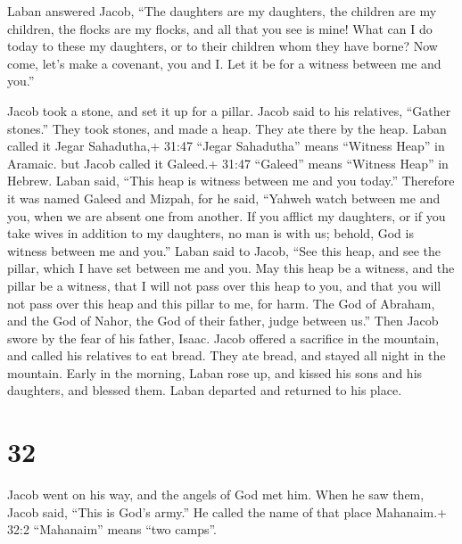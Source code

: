  Laban answered Jacob, ``The daughters are my daughters,
the children are my children, the flocks are my flocks, and all that you
see is mine! What can I do today to these my daughters, or to their
children whom they have borne?  Now come, let's make a
covenant, you and I. Let it be for a witness between me and you.''

 Jacob took a stone, and set it up for a pillar.
 Jacob said to his relatives, ``Gather stones.'' They took
stones, and made a heap. They ate there by the heap.  Laban
called it Jegar Sahadutha,+ 31:47 ``Jegar Sahadutha'' means ``Witness
Heap'' in Aramaic. but Jacob called it Galeed.+ 31:47 ``Galeed'' means
``Witness Heap'' in Hebrew.  Laban said, ``This heap is
witness between me and you today.'' Therefore it was named Galeed
 and Mizpah, for he said, ``Yahweh watch between me and
you, when we are absent one from another.  If you afflict
my daughters, or if you take wives in addition to my daughters, no man
is with us; behold, God is witness between me and you.'' 
Laban said to Jacob, ``See this heap, and see the pillar, which I have
set between me and you.  May this heap be a witness, and
the pillar be a witness, that I will not pass over this heap to you, and
that you will not pass over this heap and this pillar to me, for harm.
 The God of Abraham, and the God of Nahor, the God of their
father, judge between us.'' Then Jacob swore by the fear of his father,
Isaac.  Jacob offered a sacrifice in the mountain, and
called his relatives to eat bread. They ate bread, and stayed all night
in the mountain.  Early in the morning, Laban rose up, and
kissed his sons and his daughters, and blessed them. Laban departed and
returned to his place.

\hypertarget{section-31}{%
\section{32}\label{section-31}}

 Jacob went on his way, and the angels of God met him.
 When he saw them, Jacob said, ``This is God's army.'' He
called the name of that place Mahanaim.+ 32:2 ``Mahanaim'' means ``two
camps''.

